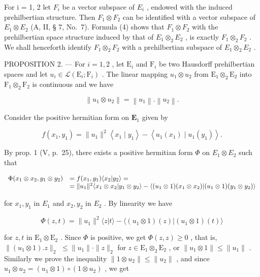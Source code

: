 For i = 1, 2 let \(F_{i}\) be a vector subspace of \(E_{i}\) , endowed with the induced prehilbertian structure. Then \(F_{1} \otimes F_{2}\) can be identified with a vector subspace of \(E_{1} \otimes E_{2}\) (A, II, § 7, No.~7). Formula (4) shows that \(F_{1} \otimes F_{2}\) with the prehilbertian space structure induced by that of \(E_{1} \otimes_{2} E_{2}\) , is exactly \(F_{1} \otimes_{2} F_{2}\) . We shall henceforth identify \(F_{1} \otimes_{2} F_{2}\) with a prehilbertian subspace of \(E_{1} \otimes_{2} E_{2}\) .

PROPOSITION 2. --- For \(i = 1, 2\) , let \(\mathrm{E}_{i}\) and \(\mathrm{F}_{i}\) be two Hausdorff prehilbertian spaces and let \(u_{i} \in \mathcal{L}(\mathrm{E}_{i}; \mathrm{F}_{i})\) . The linear mapping \(u_{1} \otimes u_{2}\) from \(\mathrm{E}_{1} \otimes_{2} \mathrm{E}_{2}\) into \(\mathrm{F}_{1} \otimes_{2} \mathrm{F}_{2}\) is continuous and we have

\[
\left\| u _ {1} \otimes u _ {2} \right\| = \left\| u _ {1} \right\|. \left\| u _ {2} \right\|.
\]

Consider the positive hermitian form on \(\mathbf{E}_1\) given by

\[
f \left(x _ {1}, y _ {1}\right) = \| u _ {1} \| ^ {2} \left\langle x _ {1} \mid y _ {1} \right\rangle - \left\langle u _ {1} \left(x _ {1}\right) \mid u _ {1} \left(y _ {1}\right) \right\rangle .
\]

By prop. 1 (V, p.~25), there exists a positive hermitian form \(\Phi\) on \(E_1 \otimes E_2\) such that

\[
\begin{array}{r l} \Phi (x _ {1} \otimes x _ {2}, y _ {1} \otimes y _ {2}) & = f (x _ {1}, y _ {1}) \langle x _ {2} | y _ {2} \rangle = \\ & = \| u _ {1} \| ^ {2} \langle x _ {1} \otimes x _ {2} | y _ {1} \otimes y _ {2} \rangle - \langle (u _ {1} \otimes 1) (x _ {1} \otimes x _ {2}) | (u _ {1} \otimes 1) (y _ {1} \otimes y _ {2}) \rangle \end{array}
\]

for \(x_{1}, y_{1}\) in \(E_{1}\) and \(x_{2}, y_{2}\) in \(E_{2}\) . By linearity we have

\[
\Phi (z, t) = \| u _ {1} \| ^ {2} \langle z | t \rangle - \langle (u _ {1} \otimes 1) (z) | (u _ {1} \otimes 1) (t) \rangle
\]

for \(z, t\) in \(\mathrm{E}_1 \otimes \mathrm{E}_2\) . Since \(\Phi\) is positive, we get \(\Phi(z, z) \geqslant 0\) , that is, \(\| (u_1 \otimes 1).z \|_2\) \(\leqslant \| u_1\| \cdot \| z\| _2\) for \(z\in \mathrm{E}_1\otimes_2\mathrm{E}_2\) , or \(\| u_1\otimes 1\| \leqslant \| u_1\|\) . Similarly we prove the inequality \(\| 1\otimes u_2\| \leqslant \| u_2\|\) , and since \(u_{1}\otimes u_{2} = (u_{1}\otimes 1)\circ (1\otimes u_{2})\) , we get

